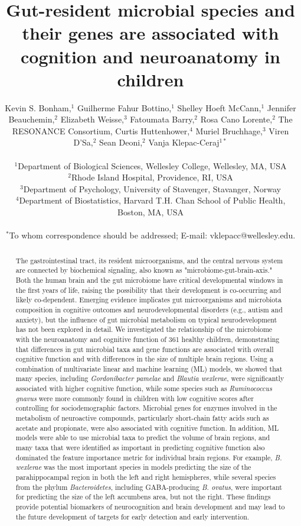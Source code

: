 \documentclass{article}
\title{Gut-resident microbial species and their genes are associated with cognition and neuroanatomy in children}
\author{%
    \parbox{\linewidth}{\centering
        Kevin S. Bonham,$^{1}$
        Guilherme Fahur Bottino,$^{1}$
        Shelley Hoeft McCann,$^{1}$
        Jennifer Beauchemin,$^{2}$
        Elizabeth Weisse,$^{3}$
        Fatoumata Barry,$^{2}$
        Rosa Cano Lorente,$^{2}$
        The RESONANCE Consortium,
        Curtis Huttenhower,$^{4}$
        Muriel Bruchhage,$^{3}$
        Viren D'Sa,$^{2}$
        Sean Deoni,$^{2}$
        Vanja Klepac-Ceraj$^{1\ast}$
    }
\\
\normalsize{$^{1}$Department of Biological Sciences, Wellesley College, Wellesley, MA, USA}\\
\normalsize{$^{2}$Rhode Island Hospital, Providence, RI, USA}\\
\normalsize{$^{3}$Department of Psychology, University of Stavenger, Stavanger, Norway}\\
\normalsize{$^{4}$Department of Biostatistics, Harvard T.H. Chan School of Public Health, Boston, MA, USA}\\
\\
\normalsize{$^\ast$To whom correspondence should be addressed; E-mail:  vklepacc@wellesley.edu.}
}
\date{}
\begin{document}
\baselineskip24pt

\maketitle 

\begin{abstract}
The gastrointestinal tract, its resident microorganisms, and the central
nervous system are connected by biochemical signaling, also known as
"microbiome-gut-brain-axis." Both the human brain and the gut microbiome
have critical developmental windows in the first years of life,
raising the possibility that their development is co-occurring and
likely co-dependent. Emerging evidence implicates gut microorganisms and
microbiota composition in cognitive outcomes and neurodevelopmental
disorders (e.g., autism and anxiety), but the influence of gut microbial
metabolism on typical neurodevelopment has not been explored in detail.
We investigated the relationship of the microbiome with the neuroanatomy
and cognitive function of 361 healthy children, demonstrating that
differences in gut microbial taxa and gene functions are associated with
overall cognitive function and with differences in the size of
multiple brain regions.
Using a combination of multivariate linear and machine learning (ML) models,
we showed that many species,
including \emph{Gordonibacter pamelae} and \emph{Blautia wexlerae}, were
significantly associated with higher cognitive function, while some
species such as \emph{Ruminococcus gnavus} were more commonly found in
children with low cognitive scores after controlling for sociodemographic factors.
Microbial genes for enzymes involved in the metabolism of
neuroactive compounds, particularly short-chain fatty acids such as
acetate and propionate, were also associated with cognitive function.
In addition, ML models were able to use microbial taxa to predict the
volume of brain regions, and many taxa that were identified
as important in predicting cognitive function also dominated the
feature importance metric for individual brain regions. For example, \emph{B.
wexlerae} was the most important species in models predicting the size of the parahippocampal region
in both the left and right hemispheres, while several species from
the phylum \textit{Bacteroidetes}, including GABA-producing
\emph{B. ovatus}, were important for predicting
the size of the left accumbens area, but not the right. These
findings provide potential biomarkers of neurocognition and brain development
and may lead to the future development of targets for early detection and early
intervention.
\end{abstract}
\end{document}
